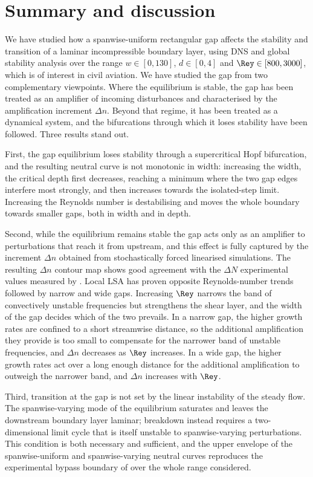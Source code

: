 \documentclass[lineno]{jfm}
\begin{document}
\section{Summary and discussion}\label{sec:conclusions}
We have studied how a spanwise-uniform rectangular gap affects the stability and transition of a laminar incompressible boundary layer, using \ac{DNS} and global stability analysis over the range $w\in[0,130]$, $d\in[0,4]$ and $\Rey\in[800,3000]$, which is of interest in civil aviation. We have studied the gap from two complementary viewpoints. Where the equilibrium is stable, the gap has been treated as an amplifier of incoming disturbances and characterised by the amplification increment $\Delta n$. Beyond that regime, it has been treated as a dynamical system, and the bifurcations through which it loses stability have been followed. Three results stand out.

First, the gap equilibrium loses stability through a supercritical Hopf bifurcation, and the resulting neutral curve is not monotonic in width: increasing the width, the critical depth first decreases, reaching a minimum where the two gap edges interfere most strongly, and then increases towards the isolated-step limit. Increasing the Reynolds number is destabilising and moves the whole boundary towards smaller gaps, both in width and in depth.

Second, while the equilibrium remains stable the gap acts only as an amplifier to perturbations that reach it from upstream, and this effect is fully captured by the increment $\Delta n$ obtained from stochastically forced linearised simulations. The resulting $\Delta n$ contour map shows good agreement with the $\Delta N$ experimental values measured by \citet{jeffGaps}. Local \ac{LSA} has proven opposite Reynolds-number trends followed by narrow and wide gaps. Increasing $\Rey$ narrows the band of convectively unstable frequencies but strengthens the shear layer, and the width of the gap decides which of the two prevails. In a narrow gap, the higher growth rates are confined to a short streamwise distance, so the additional amplification they provide is too small to compensate for the narrower band of unstable frequencies, and $\Delta n$ decreases as $\Rey$ increases. In a wide gap, the higher growth rates act over a long enough distance for the additional amplification to outweigh the narrower band, and $\Delta n$ increases with $\Rey$.

Third, transition at the gap is not set by the linear instability of the steady flow. The spanwise-varying mode of the equilibrium saturates and leaves the downstream boundary layer laminar; breakdown instead requires a two-dimensional limit cycle that is itself unstable to spanwise-varying perturbations. This condition is both necessary and sufficient, and the upper envelope of the spanwise-uniform and spanwise-varying neutral curves reproduces the experimental bypass boundary of \citet{jeffGaps} over the whole range considered.
\end{document}
